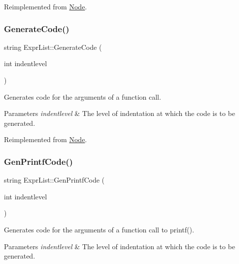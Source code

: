 Reimplemented from \hyperlink{class_node_a5f88d55c6f253a29def7ccc443d83d47}{Node}.

\mbox{\label{class_expr_list_aabde20280604379c3e0aa4396b0ea98d}} 
\subsubsection{\texorpdfstring{Generate\+Code()}{GenerateCode()}}
{\footnotesize\ttfamily string Expr\+List\+::\+Generate\+Code (\begin{DoxyParamCaption}\item[{int}]{indentlevel }\end{DoxyParamCaption})\hspace{0.3cm}{\ttfamily [virtual]}}

Generates code for the arguments of a function call. 
\begin{DoxyParams}{Parameters}
{\em indentlevel} & The level of indentation at which the code is to be generated. \\
\hline
\end{DoxyParams}


Reimplemented from \hyperlink{class_node_acb60e526730e8436056375a3055c2c32}{Node}.

\mbox{\label{class_expr_list_a4a4b3abb07a05a8be2d62cdcbcd5c070}} 
\subsubsection{\texorpdfstring{Gen\+Printf\+Code()}{GenPrintfCode()}}
{\footnotesize\ttfamily string Expr\+List\+::\+Gen\+Printf\+Code (\begin{DoxyParamCaption}\item[{int}]{indentlevel }\end{DoxyParamCaption})}

Generates code for the arguments of a function call to printf(). 
\begin{DoxyParams}{Parameters}
{\em indentlevel} & The level of indentation at which the code is to be generated. \\
\hline
\end{DoxyParams}
\mbox{\label{class_expr_list_a6174594c14ca2b1bedadc7a30aa145c5}} 
